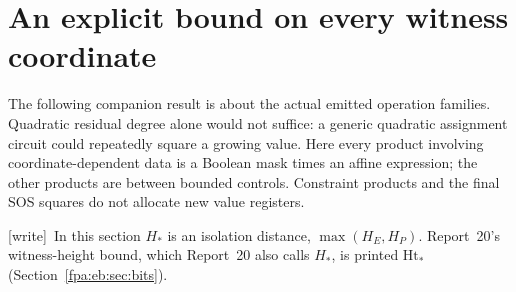 \documentclass[11pt,a4paper]{article}
\numberwithin{equation}{section}
\newcommand{\wtag}{\textup{[write]}}
\begin{document}
\section{An explicit bound on every witness coordinate}\label{fpa:pq:sec:height}
The following companion result is about the actual emitted operation families. Quadratic residual degree alone would not suffice: a generic quadratic assignment circuit could repeatedly square a growing value. Here every product involving coordinate-dependent data is a Boolean mask times an affine expression; the other products are between bounded controls. Constraint products and the final SOS squares do not allocate new value registers.

\wtag\ In this section $H_*$ is an isolation distance, $\max(H_E,H_P)$. Report~20's witness-height bound, which Report~20 also calls $H_*$, is printed $\mathrm{Ht}_*$ (Section~\ref{fpa:eb:sec:bits}).
\end{document}
